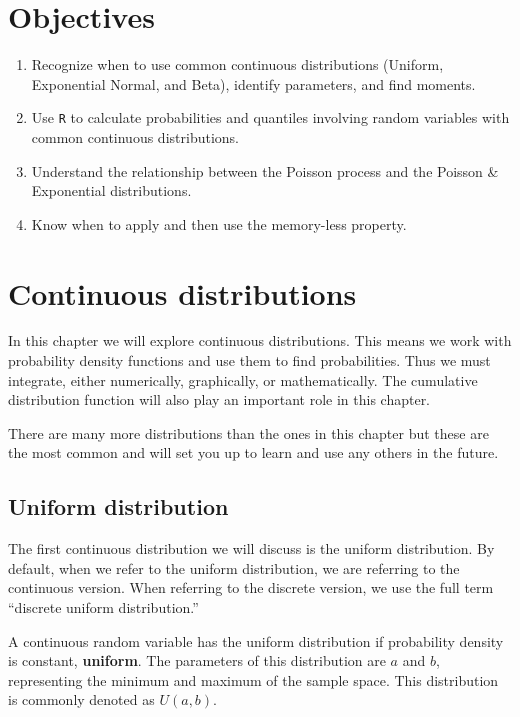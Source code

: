 \documentclass[
  letterpaper,
  DIV=11,
  numbers=noendperiod]{scrreprt}
\begin{document}
\section{Objectives}\label{objectives-13}

\begin{enumerate}
\def\labelenumi{\arabic{enumi})}
\item
  Recognize when to use common continuous distributions (Uniform,
  Exponential Normal, and Beta), identify parameters, and find moments.
\item
  Use \texttt{R} to calculate probabilities and quantiles involving
  random variables with common continuous distributions.
\item
  Understand the relationship between the Poisson process and the
  Poisson \& Exponential distributions.
\item
  Know when to apply and then use the memory-less property.
\end{enumerate}

\section{Continuous distributions}\label{continuous-distributions}

In this chapter we will explore continuous distributions. This means we
work with probability density functions and use them to find
probabilities. Thus we must integrate, either numerically, graphically,
or mathematically. The cumulative distribution function will also play
an important role in this chapter.

There are many more distributions than the ones in this chapter but
these are the most common and will set you up to learn and use any
others in the future.

\subsection{Uniform distribution}\label{uniform-distribution}

The first continuous distribution we will discuss is the uniform
distribution. By default, when we refer to the uniform distribution, we
are referring to the continuous version. When referring to the discrete
version, we use the full term ``discrete uniform distribution.''

A continuous random variable has the uniform distribution if probability
density is constant, \textbf{uniform}. The parameters of this
distribution are \(a\) and \(b\), representing the minimum and maximum
of the sample space. This distribution is commonly denoted as
\(U(a,b)\).
\end{document}
